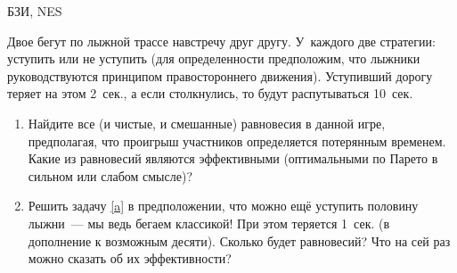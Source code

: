 \begin{problem}[Лыжники.]
\begin{source}
БЗИ, NES
\end{source} Двое бегут по лыжной
трассе навстречу друг другу. У~каждого две стратегии:
уступить или не уступить (для определенности предположим,
что лыжники руководствуются принципом правостороннего
движения). Уступивший дорогу теряет на этом 2~сек., а если
столкнулись, то будут распутываться 10~сек.

\begin{enumerate}

\item\label{a} Найдите все (и чистые, и смешанные)
равновесия в данной игре, предполагая, что проигрыш
участников определяется потерянным временем. Какие из
равновесий являются эффективными (оптимальными по Парето в
сильном или слабом смысле)?

\item Решить задачу \ref{a} в предположении, что можно ещё
уступить половину лыжни~--- мы ведь бегаем классикой! При
этом теряется 1~сек. (в дополнение к возможным десяти).
Сколько будет равновесий? Что на сей раз можно сказать об
их эффективности?

\end{enumerate}
\begin{sol}

\end{sol}
\end{problem}





